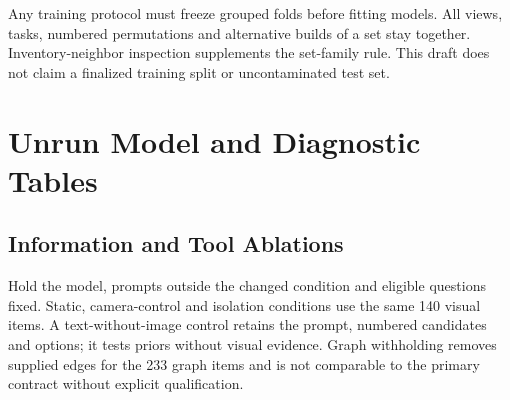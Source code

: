 \documentclass[10pt,letterpaper]{article}
\begin{document}
Any training protocol must freeze grouped folds before fitting models.
All views, tasks, numbered permutations and alternative builds of a set
stay together. Inventory-neighbor inspection supplements the set-family
rule. This draft does not claim a finalized training split or
uncontaminated test set.

\clearpage
\section{Unrun Model and Diagnostic Tables}
\begin{table}[h]
\centering\small
\caption{Planned exact success (\%) by candidate family and input.
V: 140; S: 169; G: 233; E: 75. Micro and Macro follow the main protocol.}

\end{table}

\begin{table}[h]
\centering\small
\caption{Planned per-family exact success (\%). Column abbreviations:
SmolVLM, Qwen3-VL, Llama 4, GPT-4.1, Gemini and Claude.
The $N$ column is measured dataset size; all score columns are empty.}

\end{table}

\begin{table}[h]
\centering\small
\caption{Planned source-scale exact success (\%) and overall source-macro
95\% confidence interval. Scale bands do not assert human difficulty.}

\end{table}

\begin{table}[h]
\centering\small
\caption{Planned action-task evaluation on 75 tasks. Valid: well-formed
output; Goal: legal execution reaching the goal. Cost and Steps are
means over successful tasks, accompanied by the success denominator.}

\end{table}

\clearpage
\subsection{Information and Tool Ablations}
Hold the model, prompts outside the changed condition and eligible
questions fixed. Static, camera-control and isolation conditions use
the same 140 visual items. A text-without-image control retains the
prompt, numbered candidates and options; it tests priors without
visual evidence. Graph withholding removes supplied edges for the
233 graph items and is not comparable to the primary contract without
explicit qualification.
\end{document}
